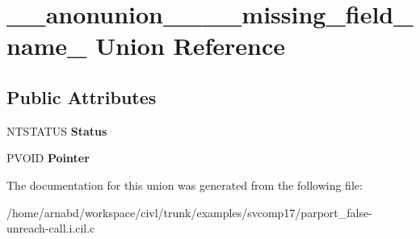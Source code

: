 \hypertarget{union____anonunion________missing__field__name__6}{}\section{\+\_\+\+\_\+anonunion\+\_\+\+\_\+\+\_\+\+\_\+missing\+\_\+field\+\_\+name\+\_ Union Reference}
\label{union____anonunion________missing__field__name__6}
\subsection*{Public Attributes}
\begin{DoxyCompactItemize}
\item 
\hypertarget{union____anonunion________missing__field__name__6_ac58f56b85b6389e35c232b37bc6fb4f2}{}N\+T\+S\+T\+A\+T\+U\+S {\bfseries Status}\label{union____anonunion________missing__field__name__6_ac58f56b85b6389e35c232b37bc6fb4f2}

\item 
\hypertarget{union____anonunion________missing__field__name__6_a1386da3310ebeef7ab9c802b2bd2a23b}{}P\+V\+O\+I\+D {\bfseries Pointer}\label{union____anonunion________missing__field__name__6_a1386da3310ebeef7ab9c802b2bd2a23b}

\end{DoxyCompactItemize}


The documentation for this union was generated from the following file\+:\begin{DoxyCompactItemize}
\item 
/home/arnabd/workspace/civl/trunk/examples/svcomp17/parport\+\_\+false-\/unreach-\/call.\+i.\+cil.\+c\end{DoxyCompactItemize}

